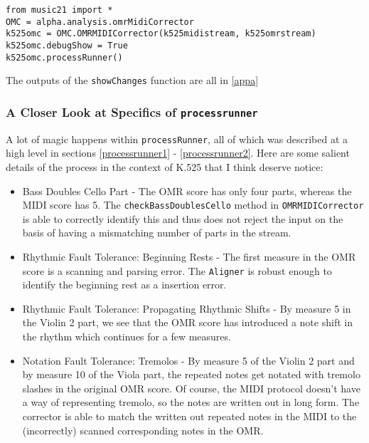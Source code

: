 \begin{verbatim}
from music21 import *
OMC = alpha.analysis.omrMidiCorrector
k525omc = OMC.OMRMIDICorrector(k525midistream, k525omrstream)
k525omc.debugShow = True
k525omc.processRunner()
\end{verbatim}

The outputs of the \texttt{showChanges} function are all in \ref{appa}

\subsubsection{A Closer Look at Specifics of \texttt{processrunner}}
A lot of magic happens within \texttt{processRunner}, all of which was described at a high level in sections \ref{processrunner1} - \ref{processrunner2}. Here are some salient details of the process in the context of K.525 that I think deserve notice:
\begin{itemize}
\item Bass Doubles Cello Part - The OMR score has only four parts, whereas the MIDI score has 5. The \texttt{checkBassDoublesCello} method in \texttt{OMRMIDICorrector} is able to correctly identify this and thus does not reject the input on the basis of having a mismatching number of parts in the stream. 
\item Rhythmic Fault Tolerance: Beginning Rests - The first measure in the OMR score is a scanning and parsing error. The \texttt{Aligner} is robust enough to identify the beginning rest as a insertion error. 
\item Rhythmic Fault Tolerance: Propagating Rhythmic Shifts - By measure 5 in the Violin 2 part, we see that the OMR score has introduced a  note shift in the rhythm which continues for a few measures. 
\item Notation Fault Tolerance: Tremolos - By measure 5 of the Violin 2 part and by measure 10 of the Viola part, the repeated  notes get notated with tremolo slashes in the original OMR score. Of course, the MIDI protocol doesn't have a way of representing tremolo, so the notes are written out in long form. The corrector is able to match the written out repeated notes in the MIDI to the (incorrectly) scanned corresponding notes in the OMR. 
\end{itemize}

